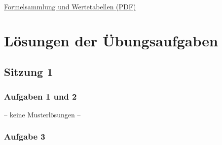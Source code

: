 \documentclass[
  11pt,
  ngerman,
  a4paper,
]{report}
\begin{document}
\href{Formelsammlung\%20und\%20Wertetabellen.pdf}{Formelsammlung und Wertetabellen (PDF)}

\hypertarget{luxf6sungen-der-uxfcbungsaufgaben}{%
\chapter*{Lösungen der Übungsaufgaben}\label{luxf6sungen-der-uxfcbungsaufgaben}}

\hypertarget{sitzung-1}{%
\section*{Sitzung 1}\label{sitzung-1}}

\hypertarget{aufgaben-1-und-2}{%
\subsection{Aufgaben 1 und 2}\label{aufgaben-1-und-2}}

-- keine Musterlösungen --

\hypertarget{aufgabe-3-2}{%
\subsection{Aufgabe 3}\label{aufgabe-3-2}}
\end{document}
